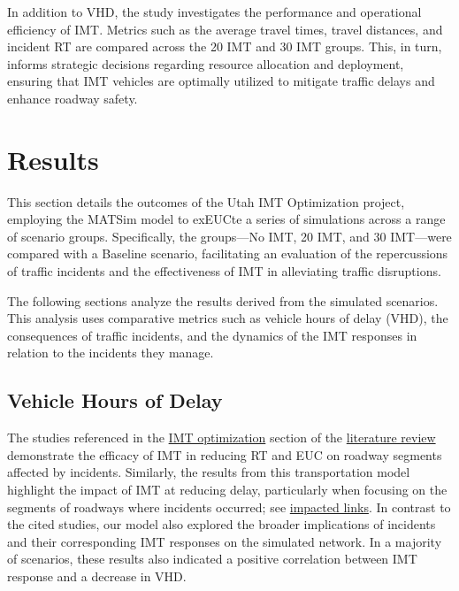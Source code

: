 \documentclass[fancy, oneside, mastersfancy, ms]{byuthesis}
\begin{document}
In addition to VHD, the study investigates the performance and
operational efficiency of IMT. Metrics such as the average travel times,
travel distances, and incident RT are compared across the 20 IMT and 30
IMT groups. This, in turn, informs strategic decisions regarding
resource allocation and deployment, ensuring that IMT vehicles are
optimally utilized to mitigate traffic delays and enhance roadway
safety.


\hypertarget{sec-results}{%
\chapter{Results}\label{sec-results}}

This section details the outcomes of the Utah IMT Optimization project,
employing the MATSim model to exEUCte a series of simulations across a
range of scenario groups. Specifically, the groups---No IMT, 20 IMT, and
30 IMT---were compared with a Baseline scenario, facilitating an
evaluation of the repercussions of traffic incidents and the
effectiveness of IMT in alleviating traffic disruptions.

The following sections analyze the results derived from the simulated
scenarios. This analysis uses comparative metrics such as vehicle hours
of delay (VHD), the consequences of traffic incidents, and the dynamics
of the IMT responses in relation to the incidents they manage.

\hypertarget{vehicle-hours-of-delay}{%
\section{Vehicle Hours of Delay}\label{vehicle-hours-of-delay}}

The studies referenced in the \protect\hyperlink{sec-lit_imt_opt}{IMT
optimization} section of the
\protect\hyperlink{sec-literature}{literature review} demonstrate the
efficacy of IMT in reducing RT and EUC on roadway segments affected by
incidents. Similarly, the results from this transportation model
highlight the impact of IMT at reducing delay, particularly when
focusing on the segments of roadways where incidents occurred; see
\protect\hyperlink{sec-impacted}{impacted links}. In contrast to the
cited studies, our model also explored the broader implications of
incidents and their corresponding IMT responses on the simulated
network. In a majority of scenarios, these results also indicated a
positive correlation between IMT response and a decrease in VHD.
\end{document}
